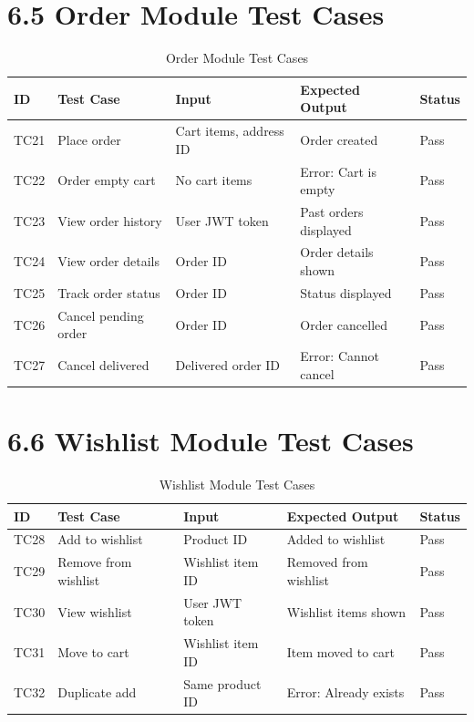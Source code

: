 \documentclass[12pt,a4paper]{report}
\begin{document}
\section*{6.5 Order Module Test Cases}

\begin{table}[H]
\centering
\small
\begin{tabular}{|p{0.8cm}|p{2.8cm}|p{3.8cm}|p{3cm}|p{1.2cm}|}
\hline
\textbf{ID} & \textbf{Test Case} & \textbf{Input} & \textbf{Expected Output} & \textbf{Status} \\
\hline
TC21 & Place order & Cart items, address ID & Order created & Pass \\
\hline
TC22 & Order empty cart & No cart items & Error: Cart is empty & Pass \\
\hline
TC23 & View order history & User JWT token & Past orders displayed & Pass \\
\hline
TC24 & View order details & Order ID & Order details shown & Pass \\
\hline
TC25 & Track order status & Order ID & Status displayed & Pass \\
\hline
TC26 & Cancel pending order & Order ID & Order cancelled & Pass \\
\hline
TC27 & Cancel delivered & Delivered order ID & Error: Cannot cancel & Pass \\
\hline
\end{tabular}
\caption{Order Module Test Cases}
\end{table}

\section*{6.6 Wishlist Module Test Cases}

\begin{table}[H]
\centering
\small
\begin{tabular}{|p{0.8cm}|p{2.8cm}|p{3.8cm}|p{3cm}|p{1.2cm}|}
\hline
\textbf{ID} & \textbf{Test Case} & \textbf{Input} & \textbf{Expected Output} & \textbf{Status} \\
\hline
TC28 & Add to wishlist & Product ID & Added to wishlist & Pass \\
\hline
TC29 & Remove from wishlist & Wishlist item ID & Removed from wishlist & Pass \\
\hline
TC30 & View wishlist & User JWT token & Wishlist items shown & Pass \\
\hline
TC31 & Move to cart & Wishlist item ID & Item moved to cart & Pass \\
\hline
TC32 & Duplicate add & Same product ID & Error: Already exists & Pass \\
\hline
\end{tabular}
\caption{Wishlist Module Test Cases}
\end{table}
\end{document}
